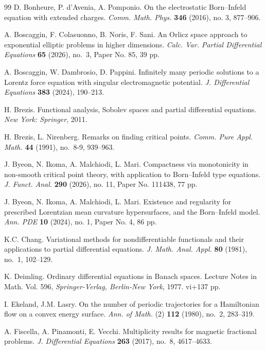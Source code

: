 \documentclass{article}
\theoremstyle{definition}
\begin{document}
\begin{thebibliography}{99}
     D. Bonheure, P. d'Avenia, A. Pomponio. On the electrostatic Born--Infeld equation with extended charges. \textsl{Comm. Math. Phys.} {\bf 346} (2016), no. 3, 877--906.
    
	 A. Boscaggin, F. Colasuonno, B. Noris, F. Sani. An Orlicz space approach to exponential elliptic problems in higher dimensions. \textsl{Calc. Var. Partial Differential Equations} {\bf 65} (2026), no.~3, Paper No. 85, 39 pp.
    
	 A. Boscaggin, W. Dambrosio, D. Pappini. Infinitely many periodic solutions to a Lorentz force equation with singular electromagnetic potential. \textsl{J. Differential Equations} {\bf 383} (2024), 190--213.
			
	 H. Brezis. Functional analysis, Sobolev spaces and partial differential equations. \textsl{New York: Springer}, 2011.
	
	 H. Brezis, L. Nirenberg. Remarks on finding critical points. \textsl{Comm. Pure Appl. Math.} {\bf 44} (1991), no.~8-9, 939--963.

     J. Byeon, N. Ikoma, A. Malchiodi, L. Mari. Compactness via monotonicity in non-smooth critical point theory, with application to Born--Infeld type equations. \textsl{J. Funct. Anal.} {\bf 290} (2026), no. 11, Paper No. 111438, 77 pp.

     J. Byeon, N. Ikoma, A. Malchiodi, L. Mari. Existence and regularity for prescribed Lorentzian mean curvature hypersurfaces, and the Born--Infeld model. \textsl{Ann. PDE} {\bf 10} (2024), no. 1, Paper No. 4, 86 pp.

     K.C. Chang. Variational methods for nondifferentiable functionals and their applications to partial differential equations. \textsl{J. Math. Anal. Appl.} {\bf 80} (1981), no.~1, 102--129.
			
	 K. Deimling. Ordinary differential equations in Banach spaces. Lecture Notes in Math. Vol. 596, \textsl{Springer-Verlag, Berlin-New York}, 1977. vi+137 pp.
			
	 I. Ekeland, J.M. Lasry. On the number of periodic trajectories for a Hamiltonian flow on a convex energy surface.  \textsl{Ann. of Math.} (2) {\bf 112} (1980), no.~2, 283--319.
    
    A. Fiscella, A. Pinamonti, E. Vecchi. Multiplicity results for magnetic fractional problems. \textsl{J. Differential Equations} {\bf 263} (2017), no.~8, 4617--4633.
    

\end{thebibliography}
\end{document}
